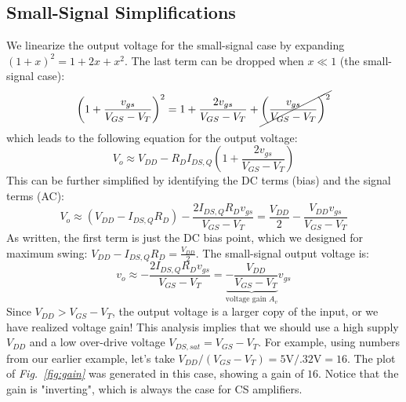 \subsection{Small-Signal Simplifications}
We linearize the output voltage for the small-signal case by expanding  $(1+x)^2 = 1 + 2x + x^2$.  The last term can be dropped when $x \ll 1$ (the small-signal case):
    \begin{equation}
        {\left( {1 + \frac{{{v_{gs}}}}{{{V_{GS}} - {V_T}}}} \right)^2} = 1 + \frac{{2{v_{gs}}}}{{{V_{GS}} - {V_T}}} + \cancel{\left( {\frac{{{v_{gs}}}}	{{{V_{GS}} - {V_T}}}} \right)^2}
    \end{equation}
which leads to the following equation for the output voltage:
    \begin{equation}
        {V_o} \approx {V_{DD}} - {R_D}{I_{DS,Q}}\left( {1 + \frac{{2{v_{gs}}}}{{{V_{GS}} - {V_T}}}} \right)
    \end{equation}
This can be further simplified by identifying the DC terms (bias) and the signal terms (AC):
    \begin{equation}
        {V_o} \approx ({V_{DD}} - {I_{DS,Q}}{R_{D}}) - \frac{{2{I_{DS,Q}}{R_{D}}{v_{gs}}}}{{{V_{GS}} - {V_T}}} = \frac{{{V_{DD}}}}{2} - \frac{{{V_{DD}}{v_{gs}}}}{{{V_{GS}} - {V_T}}}
    \end{equation}
As written, the first term is just the DC bias point, which we designed for maximum swing:  $V_{DD} - I_{DS,Q} R_{D} = \frac{V_{DD}}{2}$.  The small-signal output voltage is:
    \begin{equation}
        v_o \approx  - \frac{2I_{DS,Q} R_{D} v_{gs}}{V_{GS} - V_T} = \underbrace{ - \frac{V_{DD}}{V_{GS} - V_T}}_{\text{voltage gain } A_v}  v_{gs}
    \end{equation}
Since $V_{DD} > V_{GS} - V_T$, the output voltage is a larger copy of the input, or we have realized voltage gain!  This analysis implies that we should use a high supply $V_{DD}$ and a low over-drive voltage $V_{DS,sat} = V_{GS} - V_T$.  For example, using numbers from our earlier example, let's take $V_{DD} / (V_{GS} - V_T) = 5\mathrm{V}/.32\mathrm{V} = 16$.  The plot of \emph{Fig.~\ref{fig:gain}} was generated in this case, showing a gain of $16$.  Notice that the gain is "inverting", which is always the case for CS amplifiers.
